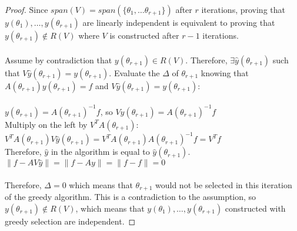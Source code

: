 \documentclass[12pt]{article}
\begin{document}
\begin{proof}
Since $span(V) = span(\{\theta_1, 
\dots \theta_{r+1}\})$ after $r$ iterations, proving that $y(\theta_1), \dots, y(\theta_{r + 1})$ are linearly independent is equivalent to proving that $y(\theta_{r+1}) \notin R(V)$ where $V$ is constructed after $r-1$ iterations.
\\
\\
Assume by contradiction that $y(\theta_{r+1}) \in R(V)$. Therefore, $\exists \widehat{y}(\theta_{r+1})$ such that $V \widehat{y}(\theta_{r+1}) = y(\theta_{r+1})$. Evaluate the $\Delta$ of $\theta_{r+1}$ knowing that $A(\theta_{r+1})y(\theta_{r+1})=f$ and $V \widehat{y}(\theta_{r+1}) = y(\theta_{r+1})$:
\\
\\
$y(\theta_{r+1}) = A(\theta_{r+1})^{-1} f$, so $V \widehat{y}(\theta_{r+1}) = A(\theta_{r+1})^{-1} f$
\\
Multiply on the left by $V^T A(\theta_{r+1})$: $V^T A(\theta_{r+1}) V \widehat{y}(\theta_{r+1}) = V^T A(\theta_{r+1}) A(\theta_{r+1})^{-1} f = V^T f$
\\
Therefore, $\widehat{y}$ in the algorithm is equal to $\widehat{y}(\theta_{r+1})$.
\\
$\|f - A V \widehat{y}\| = \|f - A y\| = \|f -f \| = 0$
\\
\\
Therefore, $\Delta = 0$ which means that $\theta_{r+1}$ would not be selected in this iteration of the greedy algorithm. This is a contradiction to the assumption, so $y(\theta_{r+1}) \notin R(V)$, which means that $y(\theta_1), \dots, y(\theta_{r + 1})$ constructed with greedy selection are independent.
\end{proof}
\end{document}
